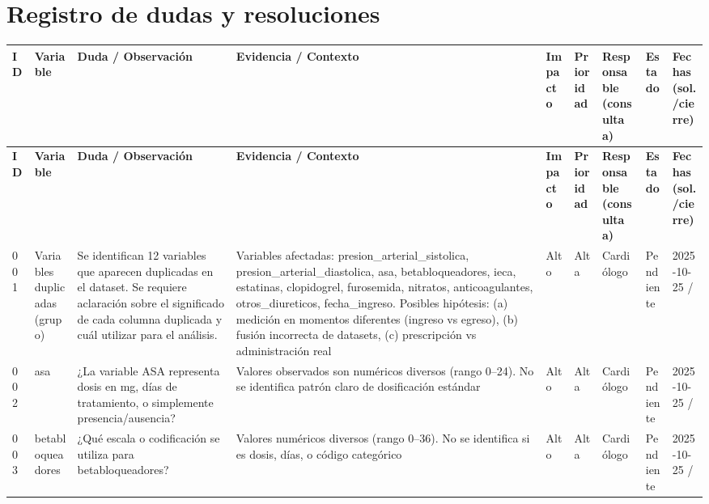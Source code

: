 \documentclass[11pt,a4paper]{article}
\renewcommand{\arraystretch}{1.2}
\begin{document}
\begin{longtable}{@{}L{0.095\textwidth} L{0.17\textwidth} L{0.07\textwidth} L{0.16\textwidth} L{0.14\textwidth} L{0.13\textwidth} L{0.15\textwidth}@{}}
\end{longtable}
\renewcommand{\arraystretch}{1.2}
\normalsize

\section{Registro de dudas y resoluciones}
\scriptsize
\setlength{\LTleft}{-1cm}
\setlength{\LTright}{-1cm}
\setlength{\tabcolsep}{1.5pt}
\renewcommand{\arraystretch}{1.15}
\begin{longtable}{@{}L{0.035\textwidth} L{0.10\textwidth} L{0.265\textwidth} L{0.17\textwidth} L{0.05\textwidth} L{0.05\textwidth} L{0.095\textwidth} L{0.065\textwidth} L{0.075\textwidth}@{}}
\toprule
\textbf{ID} & \textbf{Variable} & \textbf{Duda / Observación} & \textbf{Evidencia / Contexto} & \textbf{Impacto} & \textbf{Prioridad} & \textbf{Responsable (consulta a)} & \textbf{Estado} & \textbf{Fechas (sol./cierre)} \\
\midrule
\endfirsthead
\toprule
\textbf{ID} & \textbf{Variable} & \textbf{Duda / Observación} & \textbf{Evidencia / Contexto} & \textbf{Impacto} & \textbf{Prioridad} & \textbf{Responsable (consulta a)} & \textbf{Estado} & \textbf{Fechas (sol./cierre)} \\
\midrule
\endhead
\bottomrule
\endfoot
001 & Variables duplicadas (grupo) & Se identifican 12 variables que aparecen duplicadas en el dataset. Se requiere aclaración sobre el significado de cada columna duplicada y cuál utilizar para el análisis. & Variables afectadas: presion\_arterial\_sistolica, presion\_arterial\_diastolica, asa, betabloqueadores, ieca, estatinas, clopidogrel, furosemida, nitratos, anticoagulantes, otros\_diureticos, fecha\_ingreso. Posibles hipótesis: (a) medición en momentos diferentes (ingreso vs egreso), (b) fusión incorrecta de datasets, (c) prescripción vs administración real & Alto & Alta & Cardiólogo & Pendiente & 2025-10-25 / \\
002 & asa & ¿La variable ASA representa dosis en mg, días de tratamiento, o simplemente presencia/ausencia? & Valores observados son numéricos diversos (rango 0--24). No se identifica patrón claro de dosificación estándar & Alto & Alta & Cardiólogo & Pendiente & 2025-10-25 / \\
003 & betabloqueadores & ¿Qué escala o codificación se utiliza para betabloqueadores? & Valores numéricos diversos (rango 0--36). No se identifica si es dosis, días, o código categórico & Alto & Alta & Cardiólogo & Pendiente & 2025-10-25 / \\

\end{longtable}
\end{document}
